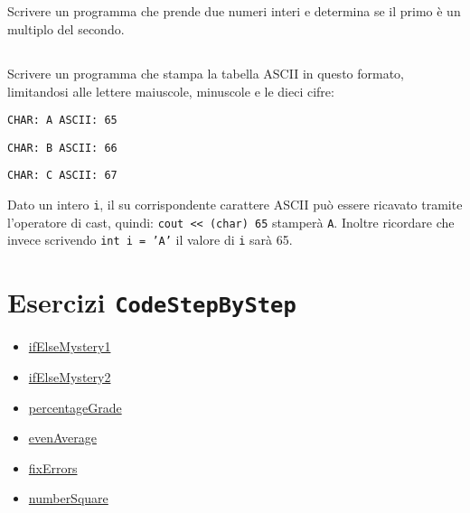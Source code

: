 \documentclass{article}
\begin{document}
\subsection{}
Scrivere un programma che prende due numeri interi e determina se il primo è un multiplo del secondo.

\subsection{}
Scrivere un programma che stampa la tabella ASCII in questo formato, limitandosi alle lettere maiuscole, minuscole e le dieci cifre:

\texttt{CHAR: A ASCII: 65}

\texttt{CHAR: B ASCII: 66}

\texttt{CHAR: C ASCII: 67}


\begin{info}
	Dato un intero \texttt{i}, il su corrispondente carattere ASCII può essere ricavato tramite l'operatore di cast, quindi:
	\texttt{cout {<}< (char) 65} stamperà \texttt{A}. 
	Inoltre ricordare che invece scrivendo \texttt{int i = 'A'} il valore di \texttt{i} sarà 65. 
\end{info}


\section*{Esercizi \texttt{CodeStepByStep}}
\begin{itemize}
	\item \href{https://www.codestepbystep.com/problem/view/cpp/ifelse/ifElseMystery1}{ifElseMystery1}
	\item \href{https://www.codestepbystep.com/problem/view/cpp/ifelse/ifElseMystery2}{ifElseMystery2}
	\item \href{https://www.codestepbystep.com/problem/view/cpp/ifelse/percentageGrade}{percentageGrade}
	\item \href{https://www.codestepbystep.com/problem/view/cpp/basics/evenAverage}{evenAverage}
	\item \href{https://www.codestepbystep.com/problem/view/cpp/basics/fixErrors}{fixErrors}
	\item \href{https://www.codestepbystep.com/problem/view/cpp/basics/numberSquare}{numberSquare}
\end{itemize}
\end{document}
